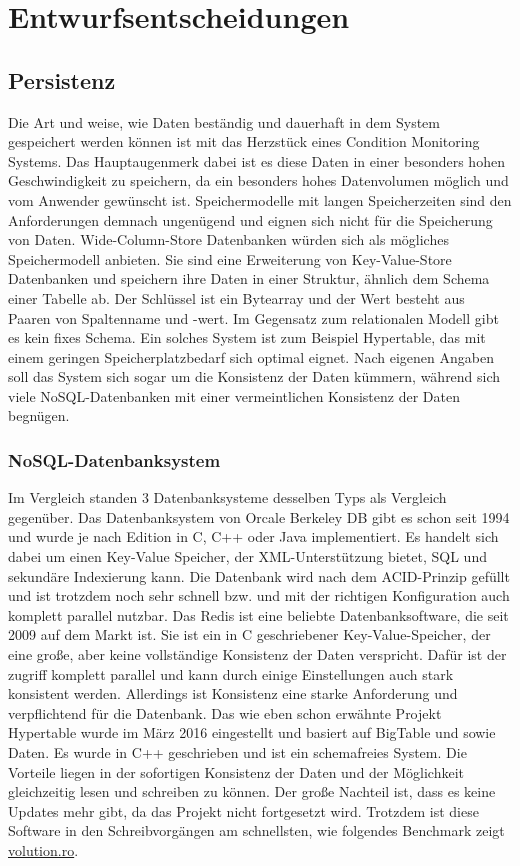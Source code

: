 \chapter{Entwurfsentscheidungen}
\section{Persistenz}
Die Art und weise, wie Daten beständig und dauerhaft in dem System gespeichert werden können ist mit das Herzstück eines Condition Monitoring Systems. Das Hauptaugenmerk dabei ist es diese Daten in einer besonders hohen Geschwindigkeit zu speichern, da ein besonders hohes Datenvolumen möglich und vom Anwender gewünscht ist. Speichermodelle mit langen Speicherzeiten sind den Anforderungen demnach ungenügend und eignen sich nicht für die Speicherung von Daten. Wide-Column-Store Datenbanken würden sich als mögliches Speichermodell anbieten. Sie sind eine Erweiterung von Key-Value-Store Datenbanken und speichern ihre Daten in einer Struktur, ähnlich dem Schema einer Tabelle ab. Der Schlüssel ist ein Bytearray und der Wert besteht aus Paaren von Spaltenname und -wert. Im Gegensatz zum relationalen Modell gibt es kein fixes Schema. Ein solches System ist zum Beispiel Hypertable, das mit einem geringen Speicherplatzbedarf sich optimal eignet. Nach eigenen Angaben soll das System sich sogar um die Konsistenz der Daten kümmern, während sich viele NoSQL-Datenbanken mit einer vermeintlichen Konsistenz der Daten begnügen.
\subsection{NoSQL-Datenbanksystem}
Im Vergleich standen 3 Datenbanksysteme desselben Typs als Vergleich gegenüber. Das Datenbanksystem von Orcale Berkeley DB gibt es schon seit 1994 und wurde je nach Edition in C, C++ oder Java implementiert. Es handelt sich dabei um einen Key-Value Speicher, der XML-Unterstützung bietet, SQL und sekundäre Indexierung kann. Die Datenbank wird nach dem ACID-Prinzip gefüllt und ist trotzdem noch sehr schnell bzw. und mit der richtigen Konfiguration auch komplett parallel nutzbar.
Das Redis ist eine beliebte Datenbanksoftware, die seit 2009 auf dem Markt ist. Sie ist ein in C geschriebener Key-Value-Speicher, der eine große, aber keine vollständige Konsistenz der Daten verspricht. Dafür ist der zugriff komplett parallel und kann durch einige Einstellungen auch stark konsistent werden. Allerdings ist Konsistenz eine starke Anforderung und verpflichtend für die Datenbank. Das wie eben schon erwähnte Projekt Hypertable wurde im März 2016 eingestellt und basiert auf BigTable und sowie Daten. Es wurde in C++ geschrieben und ist ein schemafreies System. Die Vorteile liegen in der sofortigen Konsistenz der Daten und der Möglichkeit gleichzeitig lesen und schreiben zu können. Der große Nachteil ist, dass es keine Updates mehr gibt, da das Projekt nicht fortgesetzt wird. Trotzdem ist diese Software in den Schreibvorgängen am schnellsten, wie folgendes Benchmark zeigt \href{https://wiki.volution.ro/Dehems/Benchmarks/Results}{volution.ro}.
